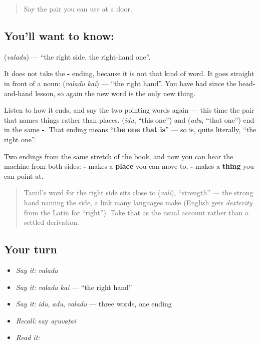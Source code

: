 \label{lesson:TA-C66-right}



\begin{quote}
Say the pair you can use at a door.
\end{quote}

\subsection*{You'll want to know: }
\textbf{} (\emph{valadu}) — \textquotedblleft{}the right side, the right-hand one\textquotedblright{}.

It does not take the \textbf{-} ending, because it is not that kind of word. It goes straight in front of a noun: \textbf{ } (\emph{valadu kai}) — \textquotedblleft{}the right hand\textquotedblright{}. You have had \textbf{} since the head-and-hand lesson, so again the new word is the only new thing.

\begin{culture}
Listen to how it ends, and say the two pointing words again — this time the pair that names things rather than places. \textbf{} (\emph{idu}, \textquotedblleft{}this one\textquotedblright{}) and \textbf{} (\emph{adu}, \textquotedblleft{}that one\textquotedblright{}) end in the same \textbf{-}. That ending means \textquotedblleft{}\textbf{the one that is}\textquotedblright{} — so \textbf{} is, quite literally, \textquotedblleft{}the right one\textquotedblright{}.

Two endings from the same stretch of the book, and now you can hear the machine from both sides: \textbf{-} makes a \textbf{place} you can move to, \textbf{-} makes a \textbf{thing} you can point at.

\begin{quote}
Tamil's word for the right side sits close to \textbf{} (\emph{vali}), \textquotedblleft{}strength\textquotedblright{} — the strong hand naming the side, a link many languages make (English gets \emph{dexterity} from the Latin for \textquotedblleft{}right\textquotedblright{}). Take that as the usual account rather than a settled derivation.
\end{quote}
\end{culture}

\subsection*{Your turn}
\begin{itemize}
\raggedright
  \item \emph{Say it:} \emph{valadu}
  \item \emph{Say it:} \emph{valadu kai} — \textquotedblleft{}the right hand\textquotedblright{}
  \item \emph{Say it:} \emph{idu}, \emph{adu}, \emph{valadu} — three words, one ending
  \item \emph{Recall:} say \emph{aṟuvaṭai}
  \item \emph{Read it:} \textbf{}
\end{itemize}

